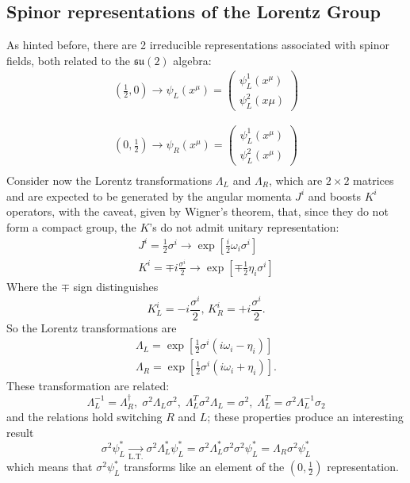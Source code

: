 \subsection{Spinor representations of the Lorentz Group}
As hinted before, there are 2 irreducible representations associated with spinor
fields, both related to the $\mathfrak{su}(2)$ algebra:
\begin{gather*}
    \left(\frac{1}{2},0\right) \rightarrow \psi_L(x^\mu) =
    \begin{pmatrix}
    \psi_L^1(x^\mu)\\
    \psi_L^2(x\mu)
    \end{pmatrix}
    \\
    \phantom{x}\\
    \left(0,\frac{1}{2}\right) \rightarrow \psi_R(x^\mu)=
    \begin{pmatrix}
    \psi_L^1(x^\mu)\\
    \psi_L^2(x^\mu)
    \end{pmatrix}\\
\end{gather*}
Consider now the Lorentz transformations $\Lambda_L$ and $\Lambda_R$, which are
$2\times2$ matrices and are expected to be generated by the angular momenta $J^i$
and boosts $K^i$ operators, with the caveat, given by Wigner's theorem, that,
since they do not form a compact group, the $K$'s do not admit unitary
representation:
\begin{gather*}
J^i = \frac{1}{2}\sigma^i\rightarrow \exp\left[\frac{i}{2}\omega_i\sigma^i\right]\\
K^i = \mp i \frac{\sigma^i}{2}\rightarrow \exp\left[\mp\frac{1}{2}\eta_i\sigma^i
\right]
\end{gather*}
Where the $\mp$ sign distinguishes
$$K_L^i = -i\frac{\sigma^i}{2},\,K_R^i = +i\frac{\sigma^i}{2}.$$
So the Lorentz transformations are 
\begin{gather*}
\Lambda_L = \exp\left[\frac{1}{2}\sigma^i\left(i\omega_i-\eta_i\right)\right]\\
\Lambda_R = \exp\left[\frac{1}{2}\sigma^i\left(i\omega_i+\eta_i\right)\right].
\end{gather*}
These transformation are related:
$$\Lambda_L^{-1} = \Lambda_R^\dagger,\; \sigma^2\Lambda_L\sigma^2,\;
\Lambda_L^T\sigma^2\Lambda_L =\sigma^2,\;\Lambda_L^T=\sigma^2 \Lambda_L^{-1}\sigma_2$$
and the relations hold switching $R$ and $L$; these properties produce an interesting
result
$$\sigma^2\psi^*_L\underset{\text{L.T.}}\rightarrow\sigma^2\Lambda_L^*\psi^*_L = 
\sigma^2\Lambda_L^*\sigma^2\sigma^2\psi_L^* = \Lambda_R\sigma^2\psi_L^*$$
which means that $\sigma^2\psi^*_L$ transforms like an element of the
$\left(0,\frac{1}{2}\right)$ representation.
